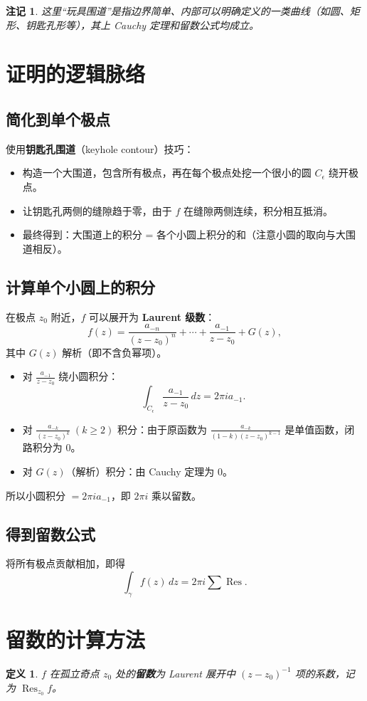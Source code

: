\documentclass[UTF8]{ctexart}
\newtheorem{definition}[theorem]{定义}
\newtheorem{remark}{注记}[section]
\numberwithin{equation}{section}
\begin{document}
\begin{remark}
这里“玩具围道”是指边界简单、内部可以明确定义的一类曲线（如圆、矩形、钥匙孔形等），其上 Cauchy 定理和留数公式均成立。
\end{remark}

\section{证明的逻辑脉络}

\subsection{简化到单个极点}
使用\textbf{钥匙孔围道}（keyhole contour）技巧：
\begin{itemize}
\item 构造一个大围道，包含所有极点，再在每个极点处挖一个很小的圆 \(C_{\epsilon}\) 绕开极点。
\item 让钥匙孔两侧的缝隙趋于零，由于 \(f\) 在缝隙两侧连续，积分相互抵消。
\item 最终得到：大围道上的积分 = 各个小圆上积分的和（注意小圆的取向与大围道相反）。
\end{itemize}

\subsection{计算单个小圆上的积分}
在极点 \(z_0\) 附近，\(f\) 可以展开为 \textbf{Laurent 级数}：
\[
f(z) = \frac{a_{-n}}{(z-z_0)^n} + \cdots + \frac{a_{-1}}{z-z_0} + G(z),
\]
其中 \(G(z)\) 解析（即不含负幂项）。
\begin{itemize}
\item 对 \(\frac{a_{-1}}{z-z_0}\) 绕小圆积分：
\[
\int_{C_{\epsilon}} \frac{a_{-1}}{z-z_0}\,dz = 2\pi i a_{-1}.
\]
\item 对 \(\frac{a_{-k}}{(z-z_0)^k}\;(k\ge 2)\) 积分：由于原函数为 \(\frac{a_{-k}}{(1-k)(z-z_0)^{k-1}}\) 是单值函数，闭路积分为 \(0\)。
\item 对 \(G(z)\)（解析）积分：由 Cauchy 定理为 \(0\)。
\end{itemize}
所以小圆积分 \(= 2\pi i a_{-1}\)，即 \(2\pi i\) 乘以留数。

\subsection{得到留数公式}
将所有极点贡献相加，即得
\[
\int_{\gamma} f(z)\,dz = 2\pi i \sum \operatorname{Res}.
\]

\section{留数的计算方法}
\begin{definition}
\(f\) 在孤立奇点 \(z_0\) 处的\textbf{留数}为 Laurent 展开中 \((z-z_0)^{-1}\) 项的系数，记为 \(\operatorname{Res}_{z_0}f\)。
\end{definition}
\end{document}
